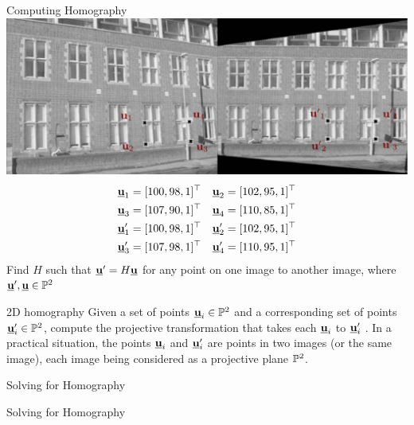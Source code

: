 \documentclass[times,t]{beamer}
\begin{document}
\begin{frame}{Computing Homography}
  \includegraphics[width=\linewidth]{media/removing-perspective-distortion.png.pdf}
  \begin{align*}
    \underline{\mathbf{u}}_1 &= [100, 98, 1]^\top&
    \underline{\mathbf{u}}_2 &= [102, 95, 1]^\top\\
    \underline{\mathbf{u}}_3 &= [107, 90, 1]^\top&
    \underline{\mathbf{u}}_4 &= [110, 85, 1]^\top \\
    \underline{\mathbf{u}}'_1 &= [100, 98, 1]^\top&
    \underline{\mathbf{u}}'_2 &= [102, 95, 1]^\top\\
    \underline{\mathbf{u}}'_3 &= [107, 98, 1]^\top&
    \underline{\mathbf{u}}'_4 &= [110, 95, 1]^\top
  \end{align*}
  Find $H$ such that $\underline{\mathbf{u}}' = H\underline{\mathbf{u}}$ for any point on one image to another
  image, where $\underline{\mathbf{u}}', \underline{\mathbf{u}} \in \mathbb{P}^2$
\end{frame}

\begin{frame}{2D homography}
  Given a set of points $\underline{\mathbf{u}}_i \in \mathbb{P}^2$ and a corresponding set of
  points $\underline{\mathbf{u}}'_i \in \mathbb{P}^2$, compute the projective transformation that takes each
  $\underline{\mathbf{u}}_i$ to $\underline{\mathbf{u}}'_i$ . In a practical situation, the points $\underline{\mathbf{u}}_i$ and   $\underline{\mathbf{u}}'_i$  are points in two images
  (or the same image), each image being considered as a projective plane  $\mathbb{P}^2$.
\end{frame}

\begin{frame}{Solving for Homography }
\end{frame}

\begin{frame}{Solving for Homography }
\end{frame}
\end{document}
